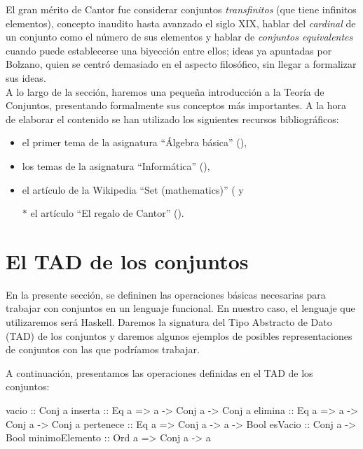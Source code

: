 El gran mérito de Cantor fue considerar conjuntos \textit{transfinitos} (que
tiene infinitos elementos), concepto inaudito hasta avanzado el siglo XIX,
hablar del \textit{cardinal} de un conjunto como el número de sus elementos y
hablar de \textit{conjuntos equivalentes} cuando puede establecerse una
biyección entre ellos; ideas ya apuntadas por Bolzano, quien se centró
demasiado en el aspecto filosófico, sin llegar a formalizar sus ideas.\\


A lo largo de la sección, haremos una pequeña introducción a la Teoría de
Conjuntos, presentando formalmente sus conceptos más importantes. A la hora de 
elaborar el contenido se han utilizado los siguientes recursos bibliográficos:

\begin{itemize}
\item el primer tema de la asignatura ``Álgebra básica'' (\cite{Algebra-15a}),
\item los temas de la asignatura ``Informática'' (\cite{Alonso-15a}),
\item el artículo de la Wikipedia ``Set (mathematics)''
  (\cite{Wikipedia-conjuntos} y
\item[$*$] el artículo ``El regalo de Cantor'' (\cite{Regalo-cantor}).
\end{itemize}

\section{El TAD de los conjuntos}

\label{sec:TAD_conjuntos}

En la presente sección, se defininen las operaciones básicas necesarias
para trabajar con conjuntos en un lenguaje funcional. En nuestro caso, 
el lenguaje que utilizaremos será Haskell. Daremos la signatura del Tipo
Abstracto de Dato (TAD) de los conjuntos y daremos algunos ejemplos de 
posibles representaciones de conjuntos con las que podríamos trabajar.

A continuación, presentamos las operaciones definidas en el TAD de los 
conjuntos:

\begin{code}
vacio          :: Conj a                         
inserta        :: Eq a => a -> Conj a -> Conj a
elimina        :: Eq a => a -> Conj a -> Conj a
pertenece      :: Eq a => Conj a -> a -> Bool  
esVacio        :: Conj a -> Bool
minimoElemento :: Ord a => Conj a -> a
\end{code}

